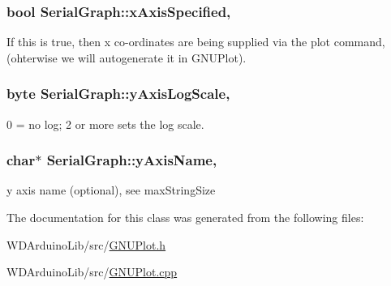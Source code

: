 \subsubsection[{x\+Axis\+Specified}]{\setlength{\rightskip}{0pt plus 5cm}bool Serial\+Graph\+::x\+Axis\+Specified\hspace{0.3cm}{\ttfamily [protected]}, {\ttfamily [inherited]}}\label{class_serial_graph_a4dbd9cf190c591fb4f2f46a50d937199}
If this is true, then x co-\/ordinates are being supplied via the plot command, (ohterwise we will autogenerate it in G\+N\+U\+Plot). \hypertarget{class_serial_graph_a1f0424857ec14c176747b3ddb0768eee}{}
\subsubsection[{y\+Axis\+Log\+Scale}]{\setlength{\rightskip}{0pt plus 5cm}byte Serial\+Graph\+::y\+Axis\+Log\+Scale\hspace{0.3cm}{\ttfamily [protected]}, {\ttfamily [inherited]}}\label{class_serial_graph_a1f0424857ec14c176747b3ddb0768eee}
0 = no log; 2 or more sets the log scale. \hypertarget{class_serial_graph_a08452a56c74ec5f5473b64605d555339}{}
\subsubsection[{y\+Axis\+Name}]{\setlength{\rightskip}{0pt plus 5cm}char$\ast$ Serial\+Graph\+::y\+Axis\+Name\hspace{0.3cm}{\ttfamily [protected]}, {\ttfamily [inherited]}}\label{class_serial_graph_a08452a56c74ec5f5473b64605d555339}
y axis name (optional), see max\+String\+Size 

The documentation for this class was generated from the following files\+:\begin{DoxyCompactItemize}
\item 
W\+D\+Arduino\+Lib/src/\hyperlink{_g_n_u_plot_8h}{G\+N\+U\+Plot.\+h}\item 
W\+D\+Arduino\+Lib/src/\hyperlink{_g_n_u_plot_8cpp}{G\+N\+U\+Plot.\+cpp}\end{DoxyCompactItemize}
